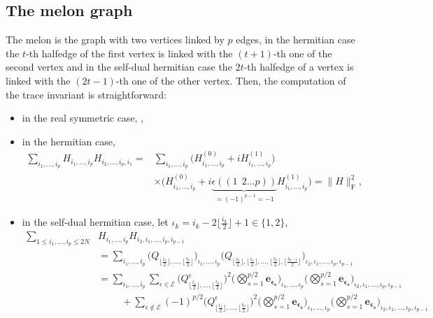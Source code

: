 \documentclass[pdftex]{sigma}
\numberwithin{equation}{section}
\theoremstyle{definition}
\begin{document}
\subsection{The melon graph}\label{melonfrob}

The melon is the graph with two vertices linked by $p$ edges, in the hermitian case the $t$-th halfedge of the first vertex is linked with the $(t+1)$-th one of the second vertex and in the self-dual hermitian case the $2t$-th halfedge of a vertex is linked with the $(2t-1)$-th one of the other vertex. Then, the computation of the trace invariant is straightforward:
\begin{itemize}\itemsep=0pt
    \item[--] in the real symmetric case,
    ,
    \item[--] in the hermitian case,
    \begin{align*}
    \sum_{i_1,\dots,i_p} H_{i_1,\dots,i_p} H_{i_2,\dots,i_p,i_1} ={}& \sum_{i_1,\dots,i_p} \bigl(H^{(0)}_{i_1,\dots,i_p} +i H^{(1)}_{i_1,\dots,i_p} \bigr) \\
    &\times\bigl(H^{(0)}_{i_1,\dots,i_p} + i \underbrace{\epsilon((1 \ \ 2 \dots p))}_{=(-1)^{p-1}=-1} H^{(1)}_{i_1,\dots,i_p}\bigr)
    = \| H \|_{\mathrm{F}}^2,
    \end{align*}
    \item[--] in the self-dual hermitian case, let $\iota_k=i_k-2\lfloor\frac{i_k}{2}\rfloor+1 \in \{1,2\}$,
\begin{align*}
    \sum_{1\leq i_1,\dots,i_{p}\leq 2N} &  H_{i_1,\dots,i_p} H_{i_2,i_1,\dots,i_p,i_{p-1}} \\
    &= \sum_{i_1,\dots,i_{p} }  \bigl(Q_{\lfloor \frac{i_{1}}{2} \rfloor,\dots,\lfloor \frac{i_{p}}{2} \rfloor}\bigr)_{\iota_1,\dots,\iota_p} \bigl(Q_{\lfloor \frac{i_{2}}{2} \rfloor,\lfloor \frac{i_{1}}{2} \rfloor,\dots,\lfloor \frac{i_{p}}{2} \rfloor,\lfloor \frac{i_{p-1}}{2} \rfloor}\bigr)_{\iota_2,\iota_1,\dots,\iota_p,\iota_{p-1}} \\
    &= \sum_{i_1,\dots,i_{p} } \sum_{\epsilon \in \mathcal{E}} \bigl(Q^{\epsilon}_{\lfloor \frac{i_{1}}{2} \rfloor,\dots,\lfloor \frac{i_{p}}{2} \rfloor}\bigr)^2 \biggl(\bigotimes_{s=1}^{p/2} \mathbf{e_{\epsilon_s}} \biggr)_{\iota_1,\dots,\iota_p} \biggl(\bigotimes_{s=1}^{p/2} \mathbf{e_{\epsilon_s}}\biggr)_{\iota_2,\iota_1,\dots,\iota_p,\iota_{p-1}} \\ & \hspace{1cm} + \sum_{\epsilon \notin \mathcal{E}} (-1)^{p/2} \bigl(Q^{\epsilon}_{\lfloor \frac{i_{1}}{2} \rfloor,\dots,\lfloor \frac{i_{p}}{2} \rfloor}\bigr)^2 \biggl(\bigotimes_{s=1}^{p/2} \mathbf{e_{\epsilon_s}}\biggr)_{\iota_1,\dots,\iota_p} \biggl(\bigotimes_{s=1}^{p/2} \mathbf{e_{\epsilon_s}}\biggr)_{\iota_2,\iota_1,\dots,\iota_p,\iota_{p-1}} \\

\end{align*}
\end{itemize}
\end{document}
